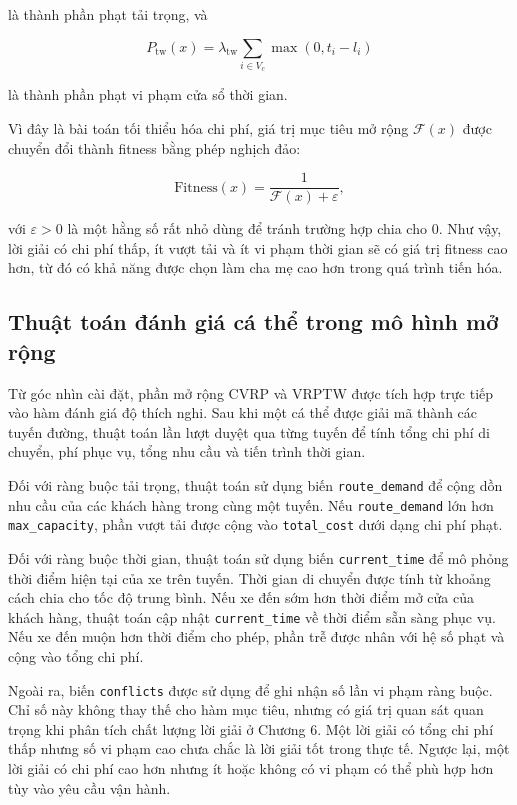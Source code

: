 \documentclass[12pt,a4paper]{article}
\numberwithin{figure}{subsection}
\begin{document}
là thành phần phạt tải trọng, và

\[
P_{\text{tw}}(x)
=
\lambda_{\text{tw}}
\sum_{i \in V_c}
\max(0, t_i - l_i)
\]

là thành phần phạt vi phạm cửa sổ thời gian.

Vì đây là bài toán tối thiểu hóa chi phí, giá trị mục tiêu mở rộng $\mathcal{F}(x)$ được chuyển đổi thành fitness bằng phép nghịch đảo:

\[
\text{Fitness}(x)
=
\frac{1}{\mathcal{F}(x) + \varepsilon},
\]

với $\varepsilon > 0$ là một hằng số rất nhỏ dùng để tránh trường hợp chia cho 0. Như vậy, lời giải có chi phí thấp, ít vượt tải và ít vi phạm thời gian sẽ có giá trị fitness cao hơn, từ đó có khả năng được chọn làm cha mẹ cao hơn trong quá trình tiến hóa.

\subsection{Thuật toán đánh giá cá thể trong mô hình mở rộng}

Từ góc nhìn cài đặt, phần mở rộng CVRP và VRPTW được tích hợp trực tiếp vào hàm đánh giá độ thích nghi. Sau khi một cá thể được giải mã thành các tuyến đường, thuật toán lần lượt duyệt qua từng tuyến để tính tổng chi phí di chuyển, phí phục vụ, tổng nhu cầu và tiến trình thời gian.

Đối với ràng buộc tải trọng, thuật toán sử dụng biến \texttt{route\_demand} để cộng dồn nhu cầu của các khách hàng trong cùng một tuyến. Nếu \texttt{route\_demand} lớn hơn \texttt{max\_capacity}, phần vượt tải được cộng vào \texttt{total\_cost} dưới dạng chi phí phạt.

Đối với ràng buộc thời gian, thuật toán sử dụng biến \texttt{current\_time} để mô phỏng thời điểm hiện tại của xe trên tuyến. Thời gian di chuyển được tính từ khoảng cách chia cho tốc độ trung bình. Nếu xe đến sớm hơn thời điểm mở cửa của khách hàng, thuật toán cập nhật \texttt{current\_time} về thời điểm sẵn sàng phục vụ. Nếu xe đến muộn hơn thời điểm cho phép, phần trễ được nhân với hệ số phạt và cộng vào tổng chi phí.

Ngoài ra, biến \texttt{conflicts} được sử dụng để ghi nhận số lần vi phạm ràng buộc. Chỉ số này không thay thế cho hàm mục tiêu, nhưng có giá trị quan sát quan trọng khi phân tích chất lượng lời giải ở Chương 6. Một lời giải có tổng chi phí thấp nhưng số vi phạm cao chưa chắc là lời giải tốt trong thực tế. Ngược lại, một lời giải có chi phí cao hơn nhưng ít hoặc không có vi phạm có thể phù hợp hơn tùy vào yêu cầu vận hành.
\end{document}
